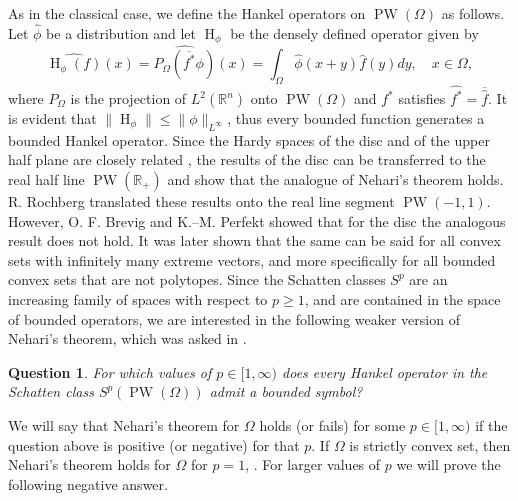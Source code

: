 \documentclass[footinclude=true]{amsart}
\theoremstyle{plain}
\newtheorem*{q}{Question}
\DeclareMathOperator{\Ha}{H}
\DeclareMathOperator{\PW}{PW}
\begin{document}
	\par As in the classical case, we define the Hankel operators on $\PW(\Omega)$ as follows. Let $\widehat{\phi}$ be a distribution and let $\Ha_\phi$ be the densely defined operator given by 
	$$\widehat{\Ha_{\phi}(f)}(x)=\widehat{P_{\Omega}(\overline{f^{\ast}}\phi)}(x)=\int_{\Omega} \widehat{\phi}(x+y)\widehat{f}(y)dy, \quad x\in \Omega,$$
	where $P_{\Omega}$ is the projection of $L^{2}(\mathbb{R}^{n})$ onto $\PW(\Omega)$ and $f^{\ast}$ satisfies $\widehat{f^{\ast}}=\overline{\widehat{f}}$. It is evident that $\|\Ha_{\phi}\|\leq \|\phi\|_{L^{\infty}}$, thus every bounded function generates a bounded Hankel operator. Since the Hardy spaces of the disc and of the upper half plane are closely related \cite[Chapter 6]{MR1892647}, the results of the disc can be transferred to the real half line $\PW(\mathbb{R}_{+})$ and show that the analogue of Nehari's theorem holds. R. Rochberg \cite{MR878246} translated these results onto the real line segment $\PW(-1,1)$. However, O. F. Brevig and K.--M. Perfekt \cite{MR4502777} showed that for the disc the analogous result does not hold. It was later shown \cite{MR4700194} that the same can be said for all convex sets with infinitely many extreme vectors, and more specifically for all bounded convex sets that are not polytopes. Since the Schatten classes $S^{p}$ are an increasing family of spaces with respect to $p\geq 1$, and are contained in the space of bounded operators, we are interested in the following weaker version of Nehari's theorem, which was asked in \cite{MR4502777}. 
	\begin{q}
	For which values of $p\in [1,\infty)$ does every Hankel operator in the Schatten class $S^p(\PW(\Omega))$ admit a bounded symbol?
	\end{q}  
	We will say that Nehari's theorem for $\Omega$ holds (or fails) for some $p\in [1,\infty)$ if the question above is positive (or negative) for that $p$. If $\Omega$ is strictly convex set, then Nehari's theorem holds for $\Omega$ for $p=1$, \cite{bampouras2024besovspacesschattenclass}. For larger values of $p$ we will prove the following negative answer.
	
\end{document}

